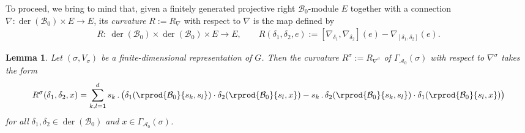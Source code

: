 \documentclass[pdftex]{sigma}
\numberwithin{equation}{section}
\newtheorem{Lemma}[Theorem]{Lemma}
\DeclareMathOperator{\der}{der}
\newcommand*{\acts}{\,.\,}
\newcommand*{\alg}{\mathcal}		%
\newcommand*{\aA}{\alg{A}}			%
\newcommand*{\aB}{\alg{B}} 			%
\begin{document}
To proceed, we bring to mind that, given a finitely generated projective right $\aB_0$-module $E$ together with a connection $\nabla\colon \der(\aB_0) \times E \to E$, its \emph{curvature} $R := R_\nabla$ with respect to $\nabla$ is the map defined by
	\begin{gather*}
		R \colon \ \der(\aB_0) \times \der(\aB_0) \times E \to E, \qquad R(\delta_1,\delta_2,e) := [ \nabla_{\delta_1},\nabla_{\delta_2} ] (e) - \nabla_{ [\delta_1,\delta_2] } (e).
	\end{gather*}

\begin{Lemma}\label{lem:cur}
	Let $(\sigma,V_\sigma)$ be a finite-dimensional representation of $G$.
	Then the curvature $R^\sigma := R_{\nabla^\sigma}$ of $\Gamma_{\aA_0}(\sigma)$ with respect to $\nabla^\sigma$ takes the form
	\begin{gather*}
	 	R^\sigma(\delta_1,\delta_2,x) = \sum_{k,l=1}^d s_k \acts \bigl( \delta_1 ( \rprod{\aB_0}{s_k,s_l} ) \cdot \delta_2 ( \rprod{\aB_0}{s_l,x} ) - s_k \acts \delta_2 ( \rprod{\aB_0}{s_k,s_l} ) \cdot \delta_1 ( \rprod{\aB_0}{s_l,x} ) \bigr)
	\end{gather*}
	for all $\delta_1,\delta_2 \in \der(\aB_0)$ and $x \in \Gamma_{\aA_0}(\sigma)$.
\end{Lemma}
\end{document}
